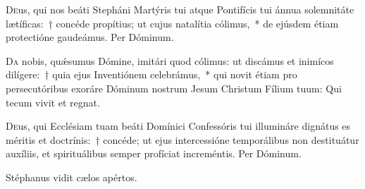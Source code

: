\documentclass[vesperale_romanum.tex]{subfiles}
\begin{document}

\oratio

\lettrine{D}{e}us, qui nos beáti Stepháni Martýris tui atque Pontifícis tui ánnua solemnitáte lætíficas:~† concéde propítius; ut cujus natalítia cólimus,~* de ejúsdem étiam protectióne gaudeámus. Per Dóminum.

\commsequentis

\myrule

\semiduplex



\oratio

\lettrine{D}{a} nobis, quǽsumus Dómine, imitári quod cólimus: ut discámus et inimícos dilígere:~† quia ejus Inventiónem celebrámus,~* qui novit étiam pro persecutóribus exoráre Dóminum nostrum Jesum Christum Fílium tuum:
Qui tecum vivit et regnat.


\vespsequentiscomm



\myrule
\newpage


\duplexmajusmtv

\oratio

\lettrine{D}{e}us, qui Ecclésiam tuam beáti Domínici Confessóris tui illumináre dignátus es méritis et doctrínis:~† concéde; ut ejus intercessióne temporálibus non destituátur auxíliis, et spirituálibus semper profíciat increméntis. Per Dóminum.


\vv Stéphanus vidit cælos apértos.
\end{document}
